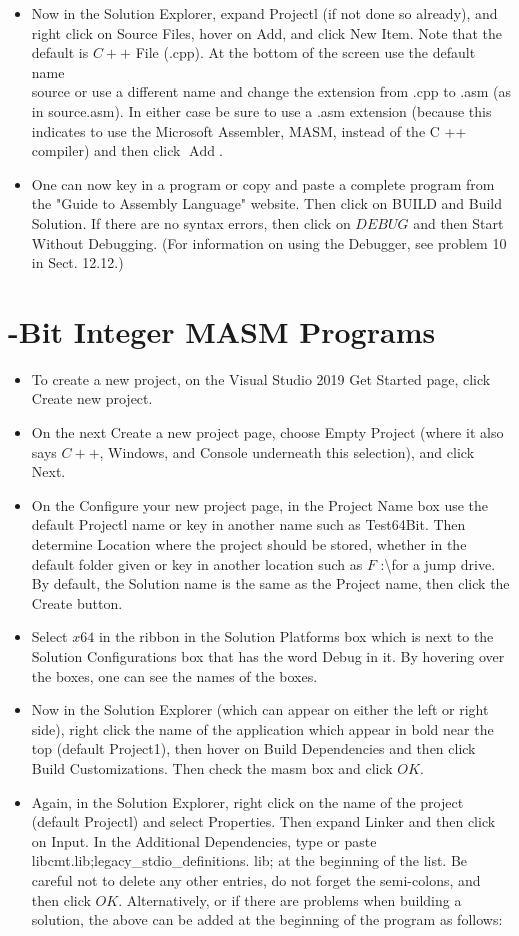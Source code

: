 \documentclass[10pt]{book}
\begin{document}
\begin{itemize}
  \item Now in the Solution Explorer, expand Projectl (if not done so already), and right click on Source Files, hover on Add, and click New Item. Note that the default is $C++$ File (.cpp). At the bottom of the screen use the default name\\
source or use a different name and change the extension from .cpp to .asm (as in source.asm). In either case be sure to use a .asm extension (because this indicates to use the Microsoft Assembler, MASM, instead of the C ++ compiler) and then click $\operatorname{Add}$.
  \item One can now key in a program or copy and paste a complete program from the "Guide to Assembly Language" website. Then click on BUILD and Build Solution. If there are no syntax errors, then click on $D E B U G$ and then Start Without Debugging. (For information on using the Debugger, see problem 10 in Sect. 12.12.)
\end{itemize}

\section{-Bit Integer MASM Programs}
\begin{itemize}
  \item To create a new project, on the Visual Studio 2019 Get Started page, click Create new project.
  \item On the next Create a new project page, choose Empty Project (where it also says $C++$, Windows, and Console underneath this selection), and click Next.
  \item On the Configure your new project page, in the Project Name box use the default Projectl name or key in another name such as Test64Bit. Then determine Location where the project should be stored, whether in the default folder given or key in another location such as $F$ :\textbackslash for a jump drive. By default, the Solution name is the same as the Project name, then click the Create button.
  \item Select $x 64$ in the ribbon in the Solution Platforms box which is next to the Solution Configurations box that has the word Debug in it. By hovering over the boxes, one can see the names of the boxes.
  \item Now in the Solution Explorer (which can appear on either the left or right side), right click the name of the application which appear in bold near the top (default Project1), then hover on Build Dependencies and then click Build Customizations. Then check the masm box and click $O K$.
  \item Again, in the Solution Explorer, right click on the name of the project (default Projectl) and select Properties. Then expand Linker and then click on Input. In the Additional Dependencies, type or paste libcmt.lib;legacy\_stdio\_definitions. lib; at the beginning of the list. Be careful not to delete any other entries, do not forget the semi-colons, and then click $O K$. Alternatively, or if there are problems when building a solution, the above can be added at the beginning of the program as follows:
\end{itemize}
\end{document}
